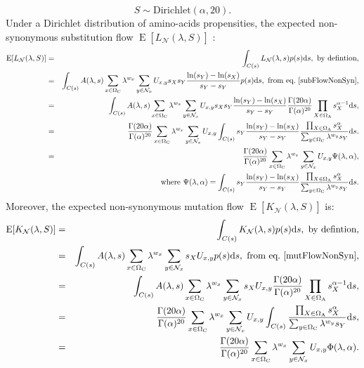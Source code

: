\documentclass{article}
\newcommand{\der}{\mathrm{d}}
\newcommand{\SetCodon}{\Omega_{\mathrm{C}}}
\newcommand{\SetAa}{\Omega_{\mathrm{A}}}
\newcommand{\NonSyn}{\mathcal{N}}
\newcommand{\NxNonSyn}{\NonSyn_x}
\begin{document}
	\begin{equation}
	S \sim \mathrm{Dirichlet}(\alpha, 20).
	\end{equation}
	Under a Dirichlet distribution of amino-acids propensities, the expected non-synonymous substitution flow $\operatorname{E} [L_{\NonSyn}(\lambda, S)]$ :
	\begin{eqnarray}
	\operatorname{E} [L_{\NonSyn}(\lambda, S)]
	& = & \int_{C(s)} L_{\NonSyn}(\lambda, s) p(s) \der s, \ \textrm{by defintion}, \\
	& = & \int_{C(s)} A(\lambda, s) \sum_{x \in \SetCodon} \lambda^{w_x} \sum_{y \in \NxNonSyn} U_{x, y} s_X s_Y\dfrac{\ln(s_Y)-\ln(s_X)}{s_Y - s_Y} p(s) \der s , \ \textrm{from eq.}\ \ref{subFlowNonSyn}, \\
	& = & \int_{C(s)} A(\lambda, s) \sum_{x \in \SetCodon} \lambda^{w_x} \sum_{y \in \NxNonSyn} U_{x, y} s_X s_Y\dfrac{\ln(s_Y)-\ln(s_X)}{s_Y - s_Y} {\frac {\Gamma (20 \alpha)}{\Gamma (\alpha )^{20}}} \prod_{X \in \SetAa} s_X^{\alpha-1} \der s,\\
	& = & {\frac {\Gamma (20 \alpha)}{\Gamma (\alpha )^{20}}} \sum_{x \in \SetCodon} \lambda^{w_x} \sum_{y \in \NxNonSyn} U_{x, y} \int_{C(s)} s_Y\dfrac{\ln(s_Y)-\ln(s_X)}{s_Y - s_Y} \dfrac{\prod_{X \in \SetAa} s_X^{\alpha}}{\sum_{y \in \SetCodon} \lambda^{w_y} s_Y} \der s.\\
	& = & {\frac {\Gamma (20 \alpha)}{\Gamma (\alpha )^{20}}} \sum_{x \in \SetCodon} \lambda^{w_x} \sum_{y \in \NxNonSyn} U_{x, y} \Psi(\lambda, \alpha), \\
	&  & \textrm{where} \ \Psi(\lambda, \alpha) = \int_{C(s)} s_Y\dfrac{\ln(s_Y)-\ln(s_X)}{s_Y - s_Y} \dfrac{\prod_{X \in \SetAa} s_X^{\alpha}}{\sum_{y \in \SetCodon} \lambda^{w_y} s_Y} \der s.
	\end{eqnarray}
	Moreover, the expected non-synonymous mutation flow $\operatorname{E} [K_{\NonSyn}(\lambda, S)]$ is:
	\begin{eqnarray}
	\operatorname{E} [K_{\NonSyn}(\lambda, S)]
	& = &   \int_{C(s)} K_{\NonSyn}(\lambda, s) p(s) \der s, \ \textrm{by defintion}, \\
	& = & \int_{C(s)} A(\lambda, s) \sum_{x \in \SetCodon} \lambda^{w_x} \sum_{y \in \NxNonSyn} s_X U_{x, y} p(s) \der s , \ \textrm{from eq.}\ \ref{mutFlowNonSyn}, \\
	& = & \int_{C(s)} A(\lambda, s) \sum_{x \in \SetCodon} \lambda^{w_x} \sum_{y \in \NxNonSyn} s_X U_{x, y}{\frac {\Gamma (20 \alpha)}{\Gamma (\alpha )^{20}}} \prod_{X \in \SetAa} s_X^{\alpha-1} \der s,\\
	& = & \frac{\Gamma (20 \alpha)}{\Gamma (\alpha )^{20}} \sum_{x \in \SetCodon} \lambda^{w_x} \sum_{y \in \NxNonSyn} U_{x, y} \int_{C(s)} \dfrac{\prod_{X \in \SetAa} s_X^{\alpha}}{\sum_{y \in \SetCodon} \lambda^{w_y} s_Y}\der s,\\
	& = & \frac{\Gamma (20 \alpha)}{\Gamma (\alpha )^{20}} \sum_{x \in \SetCodon} \lambda^{w_x} \sum_{y \in \NxNonSyn} U_{x, y} \Phi(\lambda, \alpha).\\
	\end{eqnarray}
\end{document}
